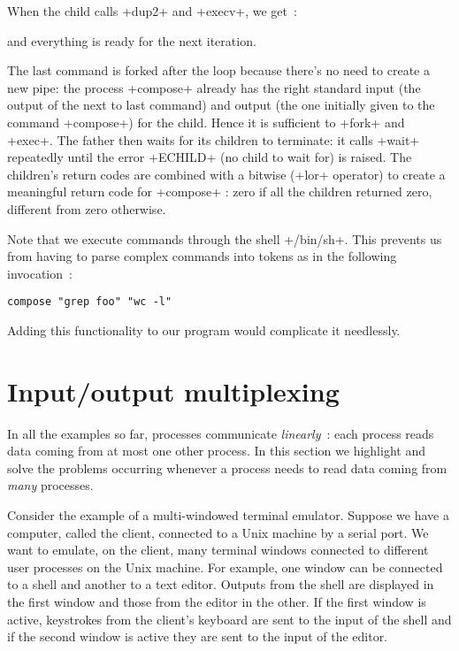 %
When the child calls \ml+dup2+ and \ml+execv+, we get~:
\begin{myimage}[width="100\%"]
\end{myimage}
%
and everything is ready for the next iteration. 

The last command is forked after the loop because there's no need to
create a new pipe: the process \ml+compose+ already has the right
standard input (the output of the next to last command) and output
(the one initially given to the command \ml+compose+) for the
child. Hence it is sufficient to \ml+fork+ and \ml+exec+. The father then
waits for its children to terminate: it calls \ml+wait+ repeatedly
until the error \ml+ECHILD+ (no child to wait for) is raised. The
children's return codes are combined with a bitwise 
(\ml+lor+ operator) to create a meaningful return code for
\ml+compose+ : zero if all the children returned zero, different from
zero otherwise.

Note that we execute commands through the shell \ml+/bin/sh+. This
prevents us from having to parse complex commands into tokens as
in the following invocation~:
%
\begin{lstlisting}
compose "grep foo" "wc -l"
\end{lstlisting}
%
Adding this functionality to our program would complicate it needlessly.

\section{Input/output multiplexing}

In all the examples so far, processes communicate \emph{linearly}~:
each process reads data coming from at most one other process. In this
section we highlight and solve the problems occurring whenever a
process needs to read data coming from \emph{many} processes.

Consider the example of a multi-windowed terminal emulator. Suppose we
have a computer, called the client, connected to a Unix machine by a
serial port. We want to emulate, on the client, many terminal windows
connected to different user processes on the Unix machine. For example,
one window can be connected to a shell and another to a text
editor. Outputs from the shell are displayed in the first window and
those from the editor in the other. If the first window is
active, keystrokes from the client's keyboard are sent to the input of
the shell and if the second window is active they are sent to the
input of the editor.

